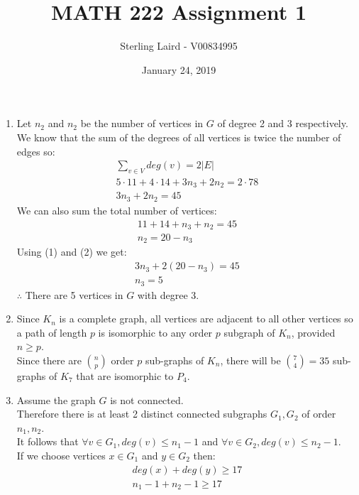 \documentclass[11pt]{article}
\title{MATH 222 Assignment 1}
\author{Sterling Laird - V00834995}
\date{January 24, 2019}
\begin{document}
\maketitle
\pagebreak

\begin{enumerate}[]
    \item
    	Let $n_2$ and $n_2$ be the number of vertices in $G$ of degree 2 and 3 respectively.\\
    	We know that the sum of the degrees of all vertices is twice the number of edges so: \\
    	\begin{gather}
			\sum_{v \in V}deg(v)=2|E| \nonumber \\
			5\cdot 11 + 4\cdot 14 + 3n_3 +2n_2 = 2\cdot 78 \nonumber \\
			3n_3 +2n_2 = 45	
   		\end{gather}
   		We can also sum the total number of vertices:
 	 	\begin{gather}
			11+14+n_3+n_2 = 45 \nonumber \\
			n_2 = 20-n_3
	    \end{gather}
	    Using (1) and (2) we get:
	    \begin{gather}
			3n_3+2(20-n_3)=45  \nonumber \\
 		   	n_3 = 5  \nonumber
		\end{gather}
    	$\therefore$ There are 5 vertices in $G$ with degree 3.
    \item 
    	Since $K_n$ is a complete graph, all vertices are adjacent to all other vertices so a path of length $p$ is isomorphic to any order $p$ subgraph of $K_n$, provided $n \geq p $.\\
    	Since there are $n \choose p$ order $p$ sub-graphs of $K_n$, there will be ${7 \choose 4} = 35$  sub-graphs of $K_7$ that are isomorphic to $P_4$. 
    \item
   		Assume the graph $G$ is not connected.\\
    	Therefore there is at least 2 distinct connected subgraphs $G_1, G_2$ of order $n_1, n_2$.\\
    	It follows that $\forall v \in G_1, deg(v) \leq n_1 -1$ and $\forall v \in G_2, deg(v) \leq n_2 -1$.\\
    	If we choose vertices $x \in G_1$ and $y \in G_2$ then:
    	\begin{gather}
			deg(x) + deg(y) \geq 17  \nonumber \\
			n_1-1 + n_2-1 \geq 17 \nonumber \\

\end{gather}
\end{enumerate}
\end{document}
